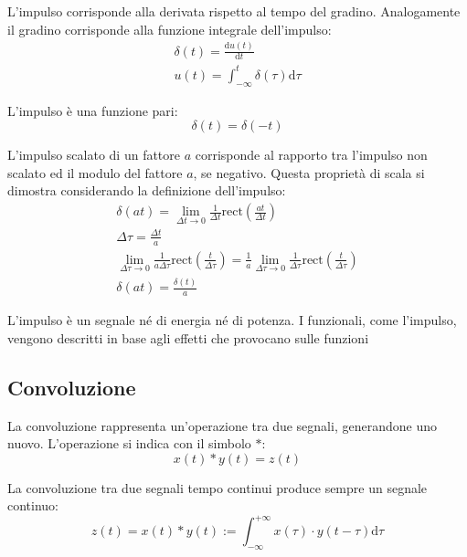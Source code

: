 \documentclass{article}
\newcommand{\rect}{\mathrm{rect}}
\newcommand{\df}{\mathrm{d}}
\numberwithin{equation}{subsection}
\begin{document}
L'impulso corrisponde alla derivata rispetto al tempo del gradino. Analogamente il gradino corrisponde alla funzione integrale dell'impulso:
\begin{gather*}
    \delta(t)=\displaystyle\frac{\df u(t)}{\df t}\\
    u(t)=\displaystyle\int_{-\infty}^t\delta(\tau)\df\tau
\end{gather*}



L'impulso è una funzione pari:
\begin{equation*}
    \delta(t)=\delta(-t)
\end{equation*}



L'impulso scalato di un fattore $a$ corrisponde al rapporto tra l'impulso non scalato ed il modulo del fattore $a$, se negativo. Questa proprietà di scala si dimostra 
considerando la definizione dell'impulso: 
\begin{gather*}
    \delta(at)=\displaystyle\lim_{\Delta t\to0}\frac{1}{\Delta t}\rect\left(\frac{at}{\Delta t}\right)\\
    \Delta\tau=\displaystyle\frac{\Delta t}{a}\\
    \displaystyle\lim_{\Delta\tau\to0}\frac{1}{a\Delta\tau}\rect\left(\frac{t}{\Delta\tau}\right)=\frac{1}{a}\lim_{\Delta\tau\to0}\frac{1}{\Delta\tau}\rect\left(\frac{t}{\Delta\tau}\right)\\
    \delta(at)=\displaystyle\frac{\delta(t)}{a}
\end{gather*}



L'impulso è un segnale né di energia né di potenza. I funzionali, come l'impulso, vengono descritti in base agli effetti che provocano sulle funzioni

\subsection{Convoluzione}

La convoluzione rappresenta un'operazione tra due segnali, generandone uno nuovo. L'operazione si indica con il simbolo $*$:
\begin{equation*}
    x(t)*y(t)=z(t)
\end{equation*}

La convoluzione tra due segnali tempo continui produce sempre un segnale continuo: 
\begin{equation}
    z(t)=x(t)*y(t):=\displaystyle\int_{-\infty}^{+\infty}x(\tau)\cdot y(t-\tau)\df\tau
\end{equation}
\end{document}
